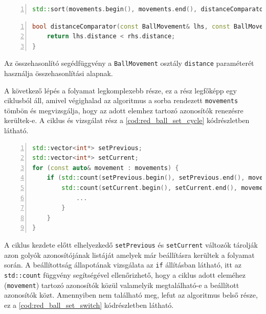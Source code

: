 \begin{codewrapper}
\begin{lstlisting}[language=C++, numbers=left, caption={Piros golyók közti távolságok sorba rendezése.}, label={cod:red_ball_sort}]
std::sort(movements.begin(), movements.end(), distanceComparator);
\end{lstlisting}
\end{codewrapper}

\begin{codewrapper}
\begin{lstlisting}[language=C++, numbers=left, caption={A \ref{cod:red_ball_sort} kódrészletben használt összehasonlító segédfüggvény.}, label={cod:red_ball_sort_helper}]
bool distanceComparator(const BallMovement& lhs, const BallMovement& rhs) {
    return lhs.distance < rhs.distance;
}
\end{lstlisting}
\end{codewrapper}

\par Az összehasonlító segédfüggvény a \lstinline{BallMovement} osztály \lstinline{distance} paraméterét használja összehasonlítási alapnak.
\par A következő lépés a folyamat legkomplexebb része, ez a rész legfőképp egy ciklusból áll, amivel végighalad az algoritmus a sorba rendezett \lstinline{movements} tömbön és megvizsgálja, hogy az adott elemhez tartozó azonosítók renezésre kerültek-e. A ciklus és vizsgálat rész a \ref{cod:red_ball_set_cycle} kódrészletben látható.

\begin{codewrapper}
\begin{lstlisting}[language=C++, numbers=left, caption={A \ref{cod:red_ball_sort} kódrészletben használt összehasonlító segédfüggvény.}, label={cod:red_ball_set_cycle}]
std::vector<int*> setPrevious;
std::vector<int*> setCurrent;
for (const auto& movement : movements) {
    if (std::count(setPrevious.begin(), setPrevious.end(), movement.previousId) <= 0 &&
        std::count(setCurrent.begin(), setCurrent.end(), movement.currentId) <= 0) {
            ...
        }
    }
}
\end{lstlisting}
\end{codewrapper}

\par A ciklus kezdete előtt elhelyezkedő \lstinline{setPrevious} és \lstinline{setCurrent} változók tárolják azon golyók azonosítójának listáját amelyek már beállításra kerültek a folyamat során. A beállítottság állapotának vizsgálata az \lstinline{if} állításban látható, itt az \lstinline{std::count} függvény segítségével ellenőrizhető, hogy a ciklus adott eleméhez (\lstinline{movement}) tartozó azonosítók közül valamelyik megtalálható-e a beállított azonosítók közt. Amennyiben nem található meg, lefut az algoritmus belső része, ez a \ref{cod:red_ball_set_switch} kódrészletben látható.

